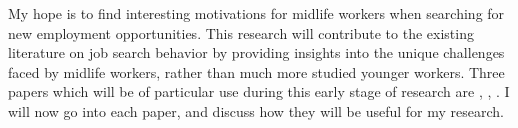 \documentclass[11pt,a4paper]{article}
\begin{document}
My hope is to find interesting motivations for midlife workers when searching for new employment opportunities. This research will contribute to the existing literature on job search behavior by providing insights into the unique challenges faced by midlife workers, rather than much more studied younger workers.
Three papers which will be of particular use during this early stage of research are \cite{kennan11search}, \cite{faberman19intensity}, \cite{dahl02roy}. I will now go into each paper, and discuss how they will be useful for my research.
\end{document}
